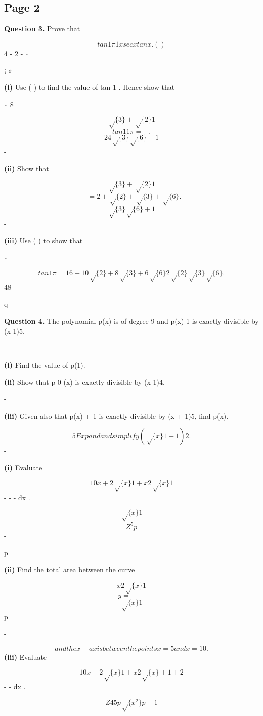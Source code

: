 \documentclass[12pt]{article}
\begin{document}
\subsection*{Page 2}
\begin{flushleft}
\bigskip\textbf{Question 3.} Prove that\par
\[tan 1 \pi 1 x sec x tan x . ( )\]
4 - 2 \equiv - ∗\par
¡ ¢\par
\textbf{(i)} Use ( ) to find the value of tan 1 \pi . Hence show that\par
∗ 8\par
\[\sqrt\{3\} + \sqrt\{2\} 1\]
\[tan 11 \pi = - .\]
\[24 \sqrt\{3\} \sqrt\{6\} + 1\]
-\par
\textbf{(ii)} Show that\par
\[\sqrt\{3\} + \sqrt\{2\} 1\]
\[- = 2 + \sqrt\{2\} + \sqrt\{3\} + \sqrt\{6\} .\]
\[\sqrt\{3\} \sqrt\{6\} + 1\]
-\par
\textbf{(iii)} Use ( ) to show that\par
∗\par
\[tan 1 \pi = 16 + 10\sqrt\{2\} + 8\sqrt\{3\} + 6\sqrt\{6\} 2 \sqrt\{2\} \sqrt\{3\} \sqrt\{6\} .\]
48 - - - -\par
q\par
\bigskip\textbf{Question 4.} The polynomial p(x) is of degree 9 and p(x) 1 is exactly divisible by (x 1)5.\par
- -\par
\textbf{(i)} Find the value of p(1).\par
\textbf{(ii)} Show that p 0 (x) is exactly divisible by (x 1)4.\par
-\par
\textbf{(iii)} Given also that p(x) + 1 is exactly divisible by (x + 1)5, find p(x).\par
\[5 Expand and simplify (\sqrt\{x\} 1 + 1)2 .\]
-\par
\textbf{(i)} Evaluate\par
\[10 x + 2\sqrt\{x\} 1 + x 2\sqrt\{x\} 1\]
- - - dx .\par
\[\sqrt\{x\} 1\]
\[Z^5 p\]
-\par
p\par
\textbf{(ii)} Find the total area between the curve\par
\[x 2\sqrt\{x\} 1\]
\[y = - -\]
\[\sqrt\{x\} 1\]
p\par
-\par
\[and the x-axis between the points x = 5 and x = 10.\]
\textbf{(iii)} Evaluate\par
\[10 x + 2\sqrt\{x\} 1 + x 2\sqrt\{x\} + 1 + 2\]
- - dx .\par
\[Z 4 5 p \sqrt\{x^2\} p - 1\]
\end{flushleft}
\end{document}
